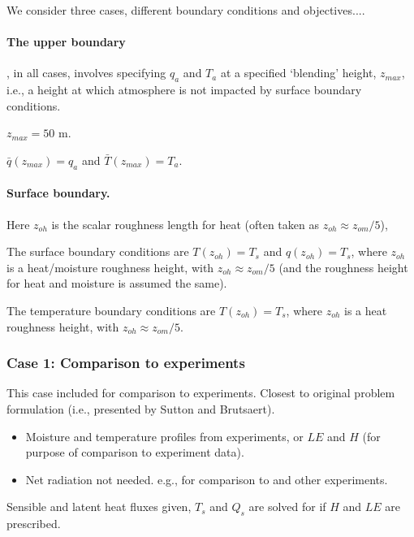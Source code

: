 \documentclass{article}
\begin{document}
    We consider three cases, different boundary conditions and objectives....
    
    \paragraph{The upper boundary}, in all  cases, involves specifying $q_a$ and $T_a$ at a specified `blending' height, $z_{max}$, i.e., a height at which atmosphere is not impacted by surface boundary conditions.  
    
    $z_{max} = 50$ m. 
    
    $\bar q (z_{max}) = q_a$ and $\bar T (z_{max}) = T_a$.
    
    \paragraph{Surface boundary.}
    Here $z_{oh}$ is the scalar roughness length for heat (often taken as $z_{oh}\approx z_{om}/5$),
    
    
    The surface boundary conditions are $T(z_{oh}) = T_s$ and $q(z_{oh}) = T_s$,  where $z_{oh}$ is a heat/moisture roughness height, with $z_{oh} \approx  z_{om}/5$ (and the roughness height for heat and moisture is assumed the same).
    
    The temperature boundary conditions are $T(z_{oh}) = T_s$,  where $z_{oh}$ is a heat roughness height, with $z_{oh} \approx  z_{om}/5$.
    
    
    \subsubsection*{Case 1: Comparison to experiments}
    
    This case included for comparison to experiments.
    Closest to original problem formulation (i.e., presented by Sutton and Brutsaert).
    
    
    \begin{itemize}
    
    \item Moisture and temperature profiles from experiments, or $LE$ and $H$ (for purpose of comparison to experiment data). 
    \item Net radiation not needed. e.g., for comparison to \cite{rider1963horizontal} and other experiments. 
    \end{itemize}
    
    Sensible and latent heat fluxes given, $T_s$ and $Q_s$ are  solved for if $H$ and $LE$ are prescribed.
    
\end{document}
